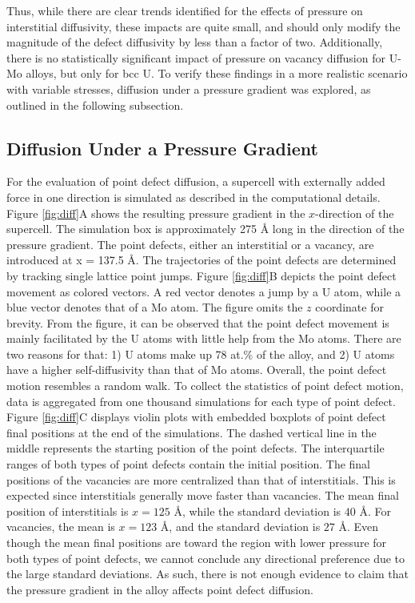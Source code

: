 \documentclass[review]{elsarticle}
\begin{document}
Thus, while there are clear trends identified for the effects of pressure on interstitial diffusivity, these impacts are quite small, and should only modify the magnitude of the defect diffusivity by less than a factor of two. Additionally, there is no statistically significant impact of pressure on vacancy diffusion for U-Mo alloys, but only for bcc U. To verify these findings in a more realistic scenario with variable stresses, diffusion under a pressure gradient was explored, as outlined in the following subsection. 

\FloatBarrier

\subsection{Diffusion Under a Pressure Gradient}

For the evaluation of point defect diffusion, a supercell with externally added force in one direction is simulated as described in the computational details. Figure \ref{fig:diff}A shows the resulting pressure gradient in the $x$-direction of the supercell. The simulation box is approximately 275 \r{A} long in the direction of the pressure gradient. The point defects, either an interstitial or a vacancy, are introduced at x = 137.5 \r{A}. The trajectories of the point defects are determined by tracking single lattice point jumps. Figure \ref{fig:diff}B depicts the point defect movement as colored vectors. A red vector denotes a jump by a U atom, while a blue vector denotes that of a Mo atom. The figure omits the $z$ coordinate for brevity. From the figure, it can be observed that the point defect movement is mainly facilitated by the U atoms with little help from the Mo atoms. There are two reasons for that: 1) U atoms make up 78 at.\% of the alloy, and 2) U atoms have a higher self-diffusivity than that of Mo atoms. Overall, the point defect motion resembles a random walk. To collect the statistics of point defect motion, data is aggregated from one thousand simulations for each type of point defect. Figure \ref{fig:diff}C displays violin plots with embedded boxplots of point defect final positions at the end of the simulations. The dashed vertical line in the middle represents the starting position of the point defects. The interquartile ranges of both types of point defects contain the initial position. The final positions of the vacancies are more centralized than that of interstitials. This is expected since interstitials generally move faster than vacancies. The mean final position of interstitials is $x = 125$ \r{A}, while the standard deviation is $40$ \r{A}. For vacancies, the mean is $x = 123$ \r{A}, and the standard deviation is $27$ \r{A}. Even though the mean final positions are toward the region with lower pressure for both types of point defects, we cannot conclude any directional preference due to the large standard deviations. As such, there is not enough evidence to claim that the pressure gradient in the alloy affects point defect diffusion.
\end{document}
